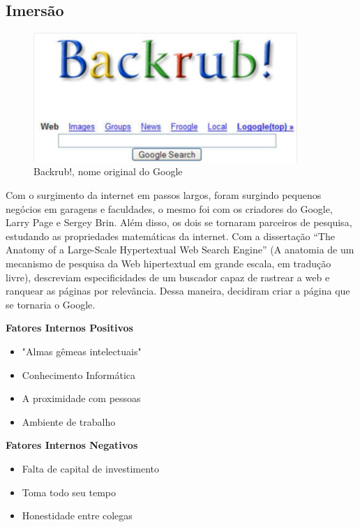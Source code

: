 \documentclass[a4paper]{article}
\begin{document}
\subsection{Imersão}
\begin{figure}[h]
    \centering
    \includegraphics[width=10cm]{images/imersão.png}
    \caption{Backrub!, nome original do Google}
\end{figure}
\par Com o surgimento da internet em passos largos, foram surgindo pequenos negócios em garagens e faculdades, o mesmo foi com os criadores do Google, Larry Page e Sergey Brin.
Além disso, os dois se tornaram parceiros de pesquisa, estudando as propriedades matemáticas da internet. Com a dissertação “The Anatomy of a Large-Scale Hypertextual Web Search Engine” (A anatomia de um mecanismo de pesquisa da Web hipertextual em grande escala, em tradução livre), descreviam especificidades de um buscador capaz de rastrear a web e ranquear as páginas por relevância. Dessa maneira, decidiram criar a página que se tornaria o Google.\\[0.3cm]

\par \textbf{\large Fatores Internos Positivos}
\begin{itemize}
    \item "Almas gêmeas intelectuais"
    \item Conhecimento Informática
    \item A proximidade com pessoas
    \item Ambiente de trabalho
\end{itemize}

\par \textbf{\large Fatores Internos Negativos}
\begin{itemize}
    \item Falta de capital de investimento
    \item Toma todo seu tempo
    \item Honestidade entre colegas
\end{itemize}  
\end{document}
